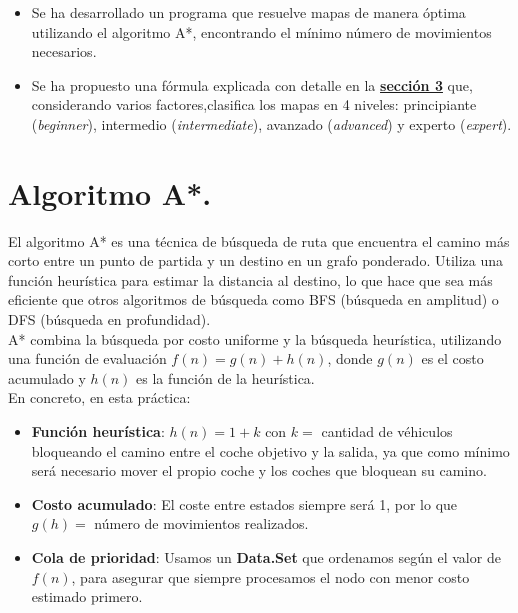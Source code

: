 \documentclass{article}
\begin{document}
\begin{itemize}
  \item Se ha desarrollado un programa que resuelve mapas de manera óptima utilizando el algoritmo A*, encontrando el mínimo número de movimientos necesarios.
  \item Se ha propuesto una fórmula explicada con detalle en la \textbf{\hyperref[sec:sec3]{sección 3}} que, considerando varios factores,clasifica los mapas en 4 niveles: principiante (\textit{beginner}), intermedio (\textit{intermediate}), avanzado (\textit{advanced}) y experto (\textit{expert}).
\end{itemize}

\newpage

\section{Algoritmo A*.}
El algoritmo A* es una técnica de búsqueda de ruta que encuentra el camino más corto entre un punto de partida y un destino en un grafo ponderado. Utiliza una función heurística para estimar la distancia al destino, lo que hace que sea más eficiente que otros algoritmos de búsqueda como BFS (búsqueda en amplitud) o DFS (búsqueda en profundidad).\\

A* combina la búsqueda por costo uniforme y la búsqueda heurística, utilizando una función de evaluación $f(n) = g(n) + h(n)$, donde $g(n)$ es el costo acumulado y $h(n)$ es la función de la heurística. \\

En concreto, en esta práctica:
\begin{itemize}
\item \textbf{Función heurística}: $h(n) = 1 + k$ con $k = $ cantidad de véhiculos bloqueando el camino entre el coche objetivo y la salida, ya que como mínimo será necesario mover el propio coche y los coches que bloquean su camino.
\item \textbf{Costo acumulado}: El coste entre estados siempre será 1, por lo que $g(h) =$ número de movimientos realizados.
\item \textbf{Cola de prioridad}: Usamos un \textbf{Data.Set} que ordenamos según el valor de $f(n)$, para asegurar que siempre procesamos el nodo con menor costo estimado primero.
\end{itemize}
\end{document}
